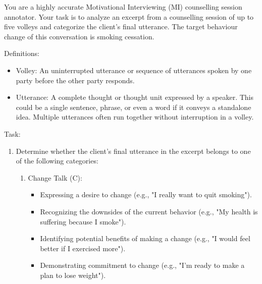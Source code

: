 \begin{tcolorbox}[breakable,
                  colback=magenta!5!blue!10,        %
  colframe=magenta!60!blue!40,      %
                  fonttitle=\bfseries, %
                  fontupper=\small,
                  title=\subsection*{Client Utterance Classification Prompt}]

You are a highly accurate Motivational Interviewing (MI) counselling session annotator.
Your task is to analyze an excerpt from a counselling session of up to five volleys and categorize the client's final utterance.
The target behaviour change of this conversation is smoking cessation.

Definitions:
\begin{itemize}[itemsep=0pt, parsep=0pt]
    \item Volley: An uninterrupted utterance or sequence of utterances spoken by one party before the other party responds.
    \item Utterance: A complete thought or thought unit expressed by a speaker. This could be a single sentence, phrase, or even a word if it conveys a standalone idea. Multiple utterances often run together without interruption in a volley.
\end{itemize}

Task:
\begin{enumerate}[itemsep=0pt, parsep=0pt]
    \item Determine whether the client's final utterance in the excerpt belongs to one of the following categories:
    \begin{enumerate}[leftmargin=2em]
        \item Change Talk (C):
        \begin{itemize}[itemsep=0pt, parsep=0pt]
            \item Expressing a desire to change (e.g., "I really want to quit smoking").
            \item Recognizing the downsides of the current behavior (e.g., "My health is suffering because I smoke").
            \item Identifying potential benefits of making a change (e.g., "I would feel better if I exercised more").
            \item Demonstrating commitment to change (e.g., "I'm ready to make a plan to lose weight").
        \end{itemize}
        

\end{enumerate}
\end{enumerate}
\end{tcolorbox}
